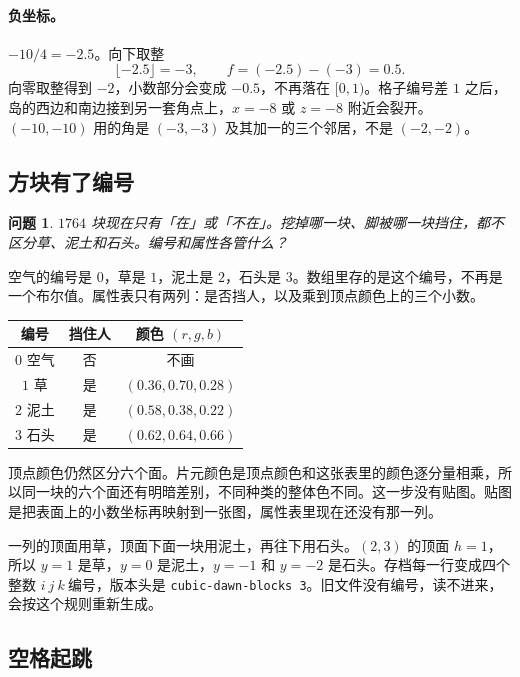 \documentclass[12pt,a4paper]{article}
\theoremstyle{definition}
\theoremstyle{plain}
\newtheorem{problem}{问题}[section]
\theoremstyle{remark}
\begin{document}
\paragraph{负坐标。}
\(-10/4=-2.5\)。向下取整
\[
\lfloor -2.5\rfloor=-3,\qquad f=(-2.5)-(-3)=0.5.
\]
向零取整得到 \(-2\)，小数部分会变成 \(-0.5\)，不再落在 \([0,1)\)。格子编号差 \(1\) 之后，岛的西边和南边接到另一套角点上，\(x=-8\) 或 \(z=-8\) 附近会裂开。\((-10,-10)\) 用的角是 \((-3,-3)\) 及其加一的三个邻居，不是 \((-2,-2)\)。

\subsection{方块有了编号}

\begin{problem}
\(1764\) 块现在只有「在」或「不在」。挖掉哪一块、脚被哪一块挡住，都不区分草、泥土和石头。编号和属性各管什么？
\end{problem}

空气的编号是 \(0\)，草是 \(1\)，泥土是 \(2\)，石头是 \(3\)。数组里存的是这个编号，不再是一个布尔值。属性表只有两列：是否挡人，以及乘到顶点颜色上的三个小数。

\begin{center}
\begin{tabular}{c|c|c}
编号 & 挡住人 & 颜色 \((r,g,b)\) \\
\hline
\(0\) 空气 & 否 & 不画 \\
\(1\) 草 & 是 & \((0.36,0.70,0.28)\) \\
\(2\) 泥土 & 是 & \((0.58,0.38,0.22)\) \\
\(3\) 石头 & 是 & \((0.62,0.64,0.66)\)
\end{tabular}
\end{center}

顶点颜色仍然区分六个面。片元颜色是顶点颜色和这张表里的颜色逐分量相乘，所以同一块的六个面还有明暗差别，不同种类的整体色不同。这一步没有贴图。贴图是把表面上的小数坐标再映射到一张图，属性表里现在还没有那一列。

一列的顶面用草，顶面下面一块用泥土，再往下用石头。\((2,3)\) 的顶面 \(h=1\)，所以 \(y=1\) 是草，\(y=0\) 是泥土，\(y=-1\) 和 \(y=-2\) 是石头。存档每一行变成四个整数 \(i\ j\ k\ \text{编号}\)，版本头是 \texttt{cubic-dawn-blocks 3}。旧文件没有编号，读不进来，会按这个规则重新生成。

\subsection{空格起跳}
\end{document}
